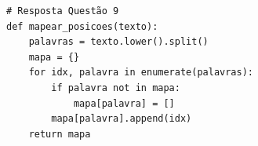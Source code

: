 \ifmostrarGabarito
\begin{verbatim}
# Resposta Questão 9
def mapear_posicoes(texto):
    palavras = texto.lower().split()
    mapa = {}
    for idx, palavra in enumerate(palavras):
        if palavra not in mapa:
            mapa[palavra] = []
        mapa[palavra].append(idx)
    return mapa
\end{verbatim}
\fi
